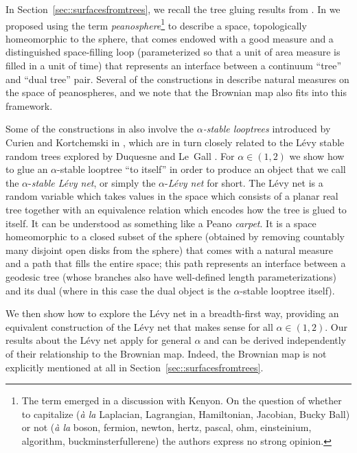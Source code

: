 \documentclass[10pt]{amsart}
\theoremstyle{plain}
\numberwithin{theorem}{section}
\theoremstyle{definition}
\begin{document}
In Section~\ref{sec::surfacesfromtrees}, we recall the tree gluing results from \cite{matingtrees}. In \cite{matingtrees} we proposed using the term \emph{peanosphere}\footnote{The term emerged in a discussion with Kenyon. On the question of whether to capitalize (\emph{à la} Laplacian, Lagrangian, Hamiltonian, Jacobian, Bucky Ball) or not (\emph{à la} boson, fermion, newton, hertz, pascal, ohm, einsteinium, algorithm, buckminsterfullerene) the authors express no strong opinion.} to describe a space, topologically homeomorphic to the sphere, that comes endowed with a good measure and a distinguished space-filling loop (parameterized so that a unit of area measure is filled in a unit of time) that represents an interface between a continuum ``tree'' and ``dual tree'' pair. Several of the constructions in \cite{matingtrees} describe natural measures on the space of peanospheres, and we note that the Brownian map also fits into this framework.

Some of the constructions in \cite{matingtrees} also involve the \emph{$\alpha$-stable looptrees} introduced by Curien and Kortchemski in \cite{ck2013looptrees}, which are in turn closely related to the Lévy stable random trees explored by Duquesne and Le~Gall \cite{dlg2002trees_levy, duquesnelegall2005levytrees, duquesnelegallhausdorff, duquesnelegallrerooting}. For $\alpha \in (1,2)$ we show how to glue an $\alpha$-stable looptree ``to itself'' in order to produce an object that we call the $\alpha$-\emph{stable Lévy net}, or simply the $\alpha$-\emph{Lévy net} for short. The Lévy net is a random variable which takes values in the space which consists of a planar real tree together with an equivalence relation which encodes how the tree is glued to itself. It can be understood as something like a Peano \emph{carpet}. It is a space homeomorphic to a closed subset of the sphere (obtained by removing countably many disjoint open disks from the sphere) that comes with a natural measure and a path that fills the entire space; this path represents an interface between a geodesic tree (whose branches also have well-defined length parameterizations) and its dual (where in this case the dual object is the $\alpha$-stable looptree itself).

We then show how to explore the Lévy net in a breadth-first way, providing an equivalent construction of the Lévy net that makes sense for all $\alpha \in (1,2)$. Our results about the Lévy net apply for general $\alpha$ and can be derived independently of their relationship to the Brownian map. Indeed, the Brownian map is not explicitly mentioned at all in Section~\ref{sec::surfacesfromtrees}.\enlargethispage{\baselineskip}%
\end{document}
